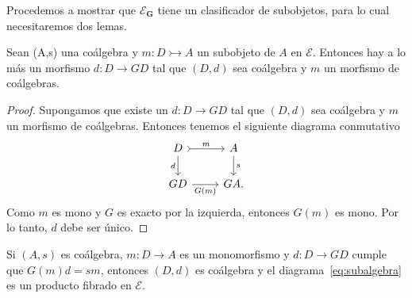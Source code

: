 Procedemos a mostrar que $\mathcal{E}_\textbf{G}$ tiene un clasificador de subobjetos, para lo cual necesitaremos dos lemas.
\begin{lemma}
  Sean (A,s) una coálgebra y $m\colon D\rightarrowtail A$ un subobjeto de $A$ en $\mathcal{E}$. Entonces hay
  a lo más un morfismo $d\colon D\to GD$ tal que $(D,d)$ sea coálgebra y $m$ un morfismo de coálgebras.
\end{lemma}
\begin{proof}
  Supongamos que existe un $d\colon D\to GD$ tal que $(D,d)$ sea coálgebra y $m$ un morfismo de coálgebras. Entonces tenemos
  el siguiente diagrama conmutativo
  \begin{equation}
    \label{eq:subalgebra}
    \begin{tikzcd}
      D\ar[tail]{r}{m}\ar[swap]{d}{d} & A\ar{d}{s} \\
      GD\ar[swap]{r}{G(m)} & GA.
    \end{tikzcd}
  \end{equation}
  Como $m$ es mono y $G$ es exacto por la izquierda, entonces $G(m)$ es mono. Por lo tanto, $d$ debe ser único.
\end{proof}
\begin{lemma}
  Si $(A,s)$ es coálgebra, $m\colon D\to A$ es un monomorfismo y $d\colon D\to
  GD$ cumple que $G(m)d=sm$, entonces $(D,d)$ 
  es coálgebra y el diagrama~\eqref{eq:subalgebra} es un producto fibrado en $\mathcal{E}$.
\end{lemma}
